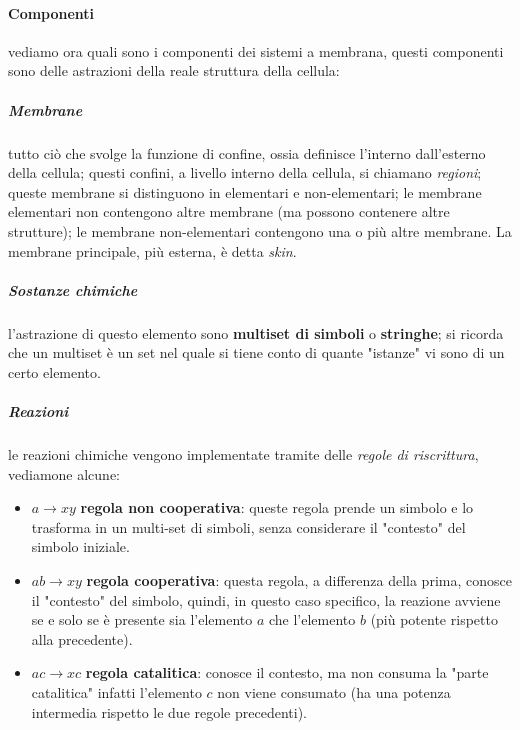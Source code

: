 \documentclass[12pt,a4paper]{report}
\begin{document}
\paragraph{Componenti}
vediamo ora quali sono i componenti dei sistemi a membrana, questi componenti sono delle astrazioni della reale struttura della cellula:

\subparagraph{Membrane}
tutto ciò che svolge la funzione di confine, ossia definisce l'interno dall'esterno della cellula; questi confini, a livello interno della cellula, si chiamano \textit{regioni}; queste membrane si distinguono in elementari e non-elementari; le membrane elementari non contengono altre membrane (ma possono contenere altre strutture); le membrane non-elementari contengono una o più altre membrane. La membrane principale, più esterna, è detta \textit{skin}.

\subparagraph{Sostanze chimiche}
l'astrazione di questo elemento sono \textbf{multiset di simboli} o \textbf{stringhe}; si ricorda che un multiset è un set nel quale si tiene conto di quante "istanze" vi sono di un certo elemento.

\subparagraph{Reazioni}
le reazioni chimiche vengono implementate tramite delle \textit{regole di riscrittura}, vediamone alcune:
\begin{itemize}
\item $a \rightarrow xy$ \textbf{regola non cooperativa}: queste regola prende un simbolo e lo trasforma in un multi-set di simboli, senza considerare il "contesto" del simbolo iniziale.
\item $ab \rightarrow xy$ \textbf{regola cooperativa}: questa regola, a differenza della prima, conosce il "contesto"  del simbolo, quindi, in questo caso specifico, la reazione avviene se e solo se è presente sia l'elemento $a$ che l'elemento $b$ (più potente rispetto alla precedente).
\item $ac \rightarrow xc$ \textbf{regola catalitica}: conosce il contesto, ma non consuma la "parte catalitica" infatti l'elemento $c$ non viene consumato (ha una potenza intermedia rispetto le due regole precedenti).
\end{itemize}
\end{document}
